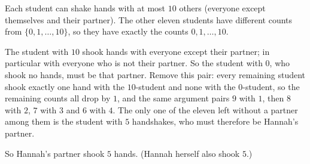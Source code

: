 Each student can shake hands with at most $10$ others (everyone except themselves and their partner). The other eleven students have different counts from $\{0,1,\dots,10\}$, so they have exactly the counts $0,1,\dots,10$.

The student with $10$ shook hands with everyone except their partner; in particular with everyone who is not their partner. So the student with $0$, who shook no hands, must be that partner. Remove this pair: every remaining student shook exactly one hand with the $10$-student and none with the $0$-student, so the remaining counts all drop by $1$, and the same argument pairs $9$ with $1$, then $8$ with $2$, $7$ with $3$ and $6$ with $4$. The only one of the eleven left without a partner among them is the student with $5$ handshakes, who must therefore be Hannah's partner.

So Hannah's partner shook $\boxed{5}$ hands. (Hannah herself also shook $5$.)
